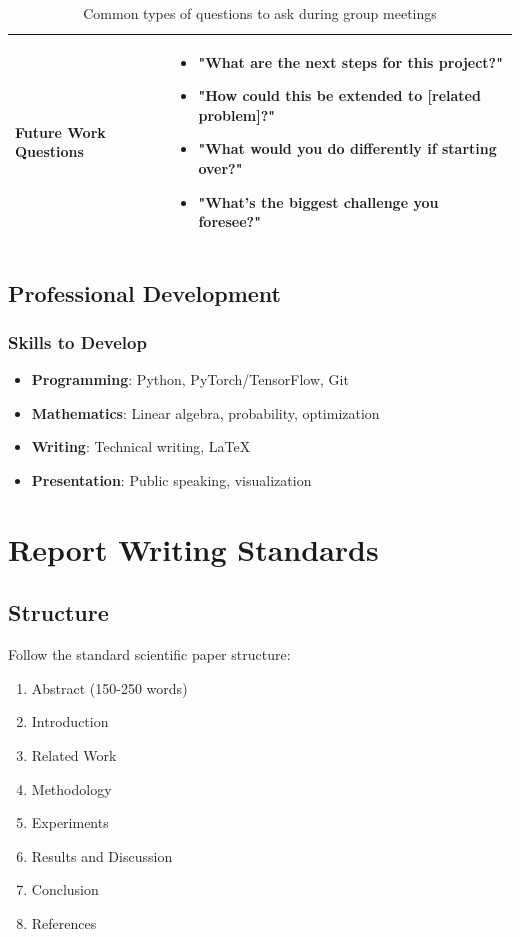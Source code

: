 \documentclass[11pt,a4paper]{article}
\begin{document}
\begin{table}[h!]
\begin{tabular}{|p{3.5cm}|p{11cm}|}
\hline
\textbf{Future Work Questions} & 
\begin{itemize}[leftmargin=*,noitemsep,topsep=0pt]
    \item "What are the next steps for this project?"
    \item "How could this be extended to [related problem]?"
    \item "What would you do differently if starting over?"
    \item "What's the biggest challenge you foresee?"
\end{itemize} \\
\hline
\end{tabular}
\caption{Common types of questions to ask during group meetings}
\label{tab:question-types}
\end{table}



\subsection{Professional Development}

\subsubsection{Skills to Develop}
\begin{itemize}
    \item \textbf{Programming}: Python, PyTorch/TensorFlow, Git
    \item \textbf{Mathematics}: Linear algebra, probability, optimization
    \item \textbf{Writing}: Technical writing, LaTeX
    \item \textbf{Presentation}: Public speaking, visualization
\end{itemize}


\section{Report Writing Standards}

\subsection{Structure}
Follow the standard scientific paper structure:
\begin{enumerate}
    \item Abstract (150-250 words)
    \item Introduction
    \item Related Work
    \item Methodology
    \item Experiments
    \item Results and Discussion
    \item Conclusion
    \item References
\end{enumerate}
\end{document}
